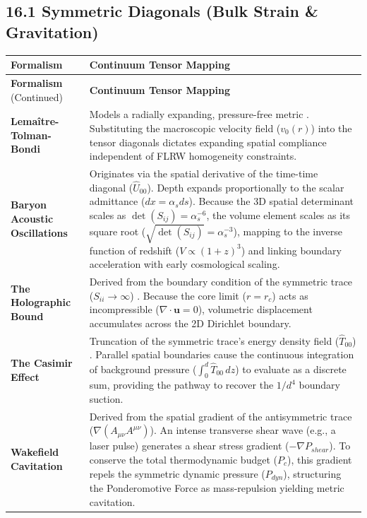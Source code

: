 \subsection*{16.1 Symmetric Diagonals (Bulk Strain \& Gravitation)}
\renewcommand{\arraystretch}{1.5}
\begin{longtable}{p{} p{}}
    \hline
    \textbf{Formalism} & \textbf{Continuum Tensor Mapping} \\
    \hline
    \endfirsthead
    \hline
    \textbf{Formalism} (Continued) & \textbf{Continuum Tensor Mapping} \\
    \hline
    \endhead
    \hline
    \endfoot
    
    \textbf{Lemaître-Tolman-Bondi} & Models a radially expanding, pressure-free metric \cite{Lemaitre1933, Tolman1934, Bondi1947}. Substituting the macroscopic velocity field ($v_0(r)$) into the tensor diagonals dictates expanding spatial compliance independent of FLRW homogeneity constraints. \\
    \textbf{Baryon Acoustic Oscillations} & Originates via the spatial derivative of the time-time diagonal ($\hat{U}_{00}$). Depth expands proportionally to the scalar admittance ($dx = \alpha_s ds$). Because the 3D spatial determinant scales as $\det(S_{ij}) = \alpha_s^{-6}$, the volume element scales as its square root ($\sqrt{\det(S_{ij})} = \alpha_s^{-3}$), mapping to the inverse function of redshift ($V \propto (1+z)^3$) and linking boundary acceleration with early cosmological scaling. \\
    \textbf{The Holographic Bound} & Derived from the boundary condition of the symmetric trace ($S_{ii} \to \infty$) \cite{Bekenstein1973}. Because the core limit ($r=r_c$) acts as incompressible ($\nabla \cdot \mathbf{u} = 0$), volumetric displacement accumulates across the 2D Dirichlet boundary. \\ 
    \textbf{The Casimir Effect} & Truncation of the symmetric trace's energy density field ($\hat{T}_{00}$) \cite{Casimir1948}. Parallel spatial boundaries cause the continuous integration of background pressure ($\int_0^d \hat{T}_{00} \, dz$) to evaluate as a discrete sum, providing the pathway to recover the $1/d^4$ boundary suction. \\ 
    \textbf{Wakefield Cavitation} & Derived from the spatial gradient of the antisymmetric trace ($\nabla(A_{\mu\nu}A^{\mu\nu})$). An intense transverse shear wave (e.g., a laser pulse) generates a shear stress gradient ($-\nabla P_{shear}$). To conserve the total thermodynamic budget ($P_c$), this gradient repels the symmetric dynamic pressure ($P_{dyn}$), structuring the Ponderomotive Force as mass-repulsion yielding metric cavitation. \\

\end{longtable}
